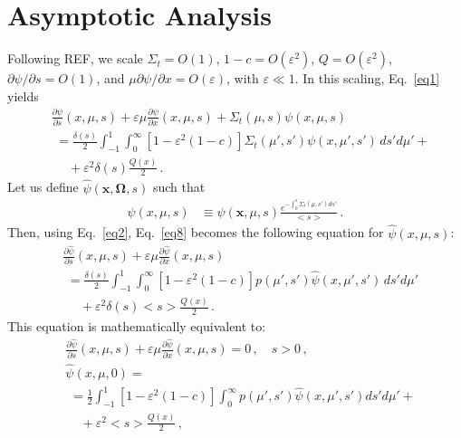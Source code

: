 \documentclass{anstrans}
\newcommand{\bl}{\big<}
\newcommand{\bg}{\big>}
\newcommand{\eps}{\varepsilon}
\begin{document}
\section{Asymptotic Analysis}
Following REF,  we scale $\Sigma_t = O(1)$, 
$ 1-c = O(\varepsilon^2) $, $Q=O(\varepsilon^2)$,  $\partial \psi / \partial s = O(1)$, and $\mu \partial \psi/\partial x = O(\eps)$, with $\varepsilon \ll 1$. In this scaling, Eq.\ \eqref{eq1} yields
  \begin{align}
    &\frac{\partial \psi}{\partial s}  (x, \mu,s) 
      + \eps\mu\frac{\partial\psi}{\partial x}(x, \mu, s)
       + \Sigma_t(\mu,s) \psi( x, \mu, s)   \label{eq8}\\
   & \,\,= \frac{\delta(s)}{2}\int_{-1}^1\int_0^{\infty}[1-\eps^2(1-c)]\Sigma_t(\mu',s') 
      \psi(x, \mu', s') \, ds' d\mu' + \nonumber \\
     &\,\,\,\,\,\,\,\, + \varepsilon^2 \delta(s)\frac{Q(x)}{2} \,.
 \nonumber
  \end{align}
Let us define $\hat\psi(\bm x, \bm \Omega, s)$ such that
  \begin{align}\label{eq9}
   \psi( x, \mu, s) &\equiv 
          \hat\psi(\bm x, \mu, s) \frac{e^{-\int_0^s \Sigma_t(\mu,s') ds'}}{\bl s\bg}\,.
  \end{align}
Then, using Eq.\ \eqref{eq2}, Eq.\ \eqref{eq8} becomes the following equation for $\hat\psi(x, \mu, s)$:
  \begin{align}\label{eq10}
    &\frac{\partial \hat\psi}{\partial s} (x, \mu,s) 
      + \varepsilon \mu\frac{\partial\hat\psi}{\partial x}(x,\mu, s)  \\
   & \,\,= \frac{\delta(s)}{2} \int_{-1}^1 \int_0^{\infty} [1-\eps^2(1-c)] p(\mu',s')
      \hat\psi(x, \mu', s') \, ds' d\mu'\nonumber\\
      & \,\,\,\,\,\,\,\,
      + \varepsilon^2 \delta(s) \bl s\bg \frac{Q(x)}{2} \,.\nonumber 
  \end{align}
This equation is mathematically equivalent to:
   \begin{subequations}
   \begin{align}
      &\frac{\partial \hat\psi}{\partial s} (x, \mu,s) 
         + \varepsilon \mu\frac{\partial\hat\psi}{\partial x}(x, \mu, s) = 0 \,, \quad s > 0 \,,\label{eq11a}\\
       &\hat\psi(x, \mu, 0)  =\\
       &\,\,=\frac{1}{2}\int_{-1}^1 [1-\eps^2(1-c)] \int_0^{\infty} p(\mu',s')
\hat\psi(x, \mu', s') ds' d\mu' + \nonumber\\
         &\,\,\,\,\,\,\, + \varepsilon^2 \bl s\bg \frac{Q(x)}{2} \,,\nonumber
   \end{align}
   \end{subequations}
\end{document}
